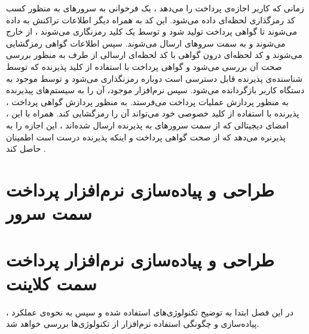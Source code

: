 \documentclass[oneside]{report}
\begin{document}
  زمانی که کاربر اجازه‌ی پرداخت را می‌دهد ، یک فرخوانی به سرورهای 
  {\normalsize {}} 
  به منظور کسب کد رمزگذاری لحظه‌ای 
     داده می‌شود. این کد به همراه دیگر اطلاعات تراکنش به 
      {\normalsize {}} 
      داده می‌شوند تا گواهی پرداخت 
      تولید شود و توسط یک کلید 
       {\normalsize {}} 
    رمزنگاری می‌شوند ، از 
     {\normalsize {}} 
     خارج می‌شوند 
    و به سمت سروهای 
     {\normalsize {}} 
     ارسال می‌شوند. سپس اطلاعات گواهی رمزگشایی می‌شوند و کد لحظه‌ای درون گواهی با کد لحظه‌ای ارسالی از طرف 
          {\normalsize {}} 
    به منظور بررسی صحت آن بررسی می‌شود و گواهی پرداخت با استفاده از کلید پذیرنده که توسط شناسنده‌ی پذیرنده قابل دسترسی است دوباره رمزنگذاری می‌شود و  توسط 
         {\normalsize {}} 
         موجود به دستگاه کاربر بازگردانده می‌شود.  سپس نرم‌افزار موجود، آن را به سیستم‌های پیذیرنده به منظور پردازش عملیات پرداخت می‌فرستد. به منظور پردازش گواهی پرداخت ، پذیرنده با استفاده از کلید خصوصی 
         خود می‌تواند آن را رمزگشایی کند. همراه با این ، امضای دیجیتالی که از سمت سرورهای 
         {\normalsize {}} 
                به پذیرنده ارسال شده‌اند ، این اجازه را به پذیرنره می‌دهد که از صحت گواهی پرداخت و اینکه پذیرنده درست است اطمینان حاصل کند .      
      \cite{iossecurity}
               
               
 
		
		
		\chapter{طراحی و پیاده‌سازی نرم‌افزار پرداخت سمت سرور}\label{serverimplementation}
		
		
		
		\chapter{طراحی و پیاده‌سازی نرم‌افزار پرداخت سمت کلاینت}\label{clientimplementation}
در این فصل ابتدا به توضیح تکنولوژی‌های استفاده شده و سپس به نحوه‌ی عملکرد ، پیاده‌سازی و چگونگی استفاده نرم‌افزار از تکنولوژی‌ها بررسی خواهد شد.
\end{document}
